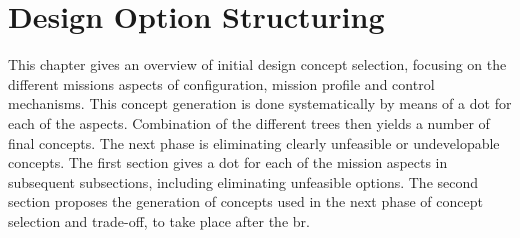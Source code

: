 \section{Design Option Structuring} \label{ch:design}
This chapter gives an overview of initial design concept selection, focusing on the different missions aspects of configuration, mission profile and control mechanisms. This concept generation is done systematically by means of a \acrfull{dot} for each of the aspects. Combination of the different trees then yields a number of final concepts. The next phase is eliminating clearly unfeasible or undevelopable concepts. The first section gives a \gls{dot} for each of the mission aspects in subsequent subsections, including eliminating unfeasible options. The second section proposes the generation of concepts used in the next phase of concept selection and trade-off, to take place after the \gls{br}.

%
%
